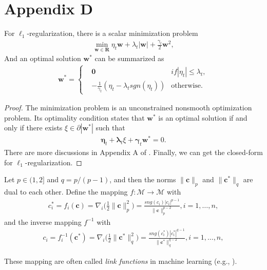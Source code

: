 \documentclass[10pt]{llncs}
\begin{document}
\section{Appendix D}
\begin{lemma}
For $\ell_1$-regularization, there is a scalar minimization problem
  \begin{align*}
    \min\limits_{\mathbf w \in \mathbf{R}} \eta_t\mathbf w+\lambda_t|\mathbf w|+\frac{\gamma_t}{2}\mathbf w^2,
  \end{align*}
And an optimal solution $\mathbf w^\ast$ can be summarized as
  \begin{align*}
    \mathbf w^\ast=\left\{
        \begin{aligned}
        &\mathbf{0}  &if |\eta_t| \leq \lambda_t,\\
        &-\frac{1}{\gamma_t}(\eta_t-\lambda_t sgn(\eta_t)) &\textrm{otherwise}.
        \end{aligned}
    \right.
  \end{align*}
\end{lemma}
\begin{proof}
The minimization problem is an unconstrained nonsmooth optimization problem. Its optimality condition \cite{rockafellar2015convex} states that $\mathbf{w}^\ast$ is an optimal solution if and only if there exists $\xi \in \partial|\mathbf{w}^\ast|$ such that
\begin{align*}
    \mathbf{\eta}_t+\mathbf{\lambda}_t\xi+\mathbf{\gamma}_t\mathbf{w}^\ast=0.
\end{align*}
There are more discussions in Appendix A of \cite{Xiao10}. Finally, we can get the closed-form for $\ell_1$-regularization.
\end{proof}

\begin{lemma}
  \label{inverse-mapping}
  Let $p \in (1,2]$ and $q=p/(p-1)$, and then the norms $\|\pmb{c}\|_p$ and $\|\pmb{c}^\ast\|_q$ are dual to each other. Define the mapping $f:\mathcal{M} \to \mathcal{M}$ with
  \begin{align*}
    c_i^\ast=f_i(\pmb{c})=\nabla_i\Big(\frac{1}{2}\|\pmb{c}\|_p^2\Big)=\frac{sng(c_i)|c_i|^{p-1}}{\|\pmb{c}\|_p^{p-2}}, i=1,\ldots,n,
  \end{align*}
and the inverse mapping $f^{-1}$ with
  \begin{align*}
    c_i=f^{-1}_i(\pmb{c}^\ast)=\nabla_i\Big(\frac{1}{2}\|\pmb{c}^\ast\|_q^2\Big)=\frac{sng(c_i^\ast)|c_i^\ast|^{q-1}}{\|\pmb{c}^\ast\|_q^{q-2}}, i=1,\ldots,n,
  \end{align*}
\end{lemma}
These mapping are often called {\em link functions} in machine learning (e.g., \cite{Gentile03a}).
\end{document}
